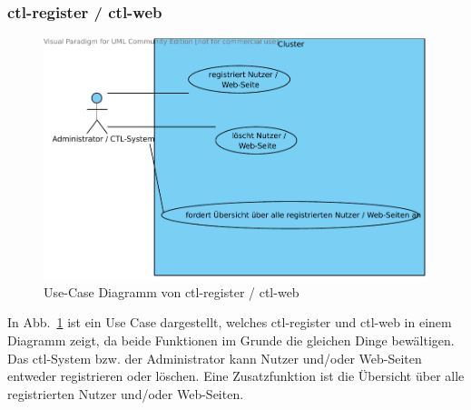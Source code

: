 \subsubsection{ctl-register / ctl-web}
\begin{figure}[H]
  \begin{center}
	\includegraphics[scale=0.6]{bilder/ctl-register_usecase.pdf}
	\caption{Use-Case Diagramm von ctl-register / ctl-web}
	\label{g_ctl-register_uc}
  \end{center}
\end{figure}
In Abb.\ \ref{g_ctl-register_uc} ist ein Use Case dargestellt, welches
ctl-register und ctl-web in einem Diagramm zeigt, da beide Funktionen im Grunde  
die gleichen Dinge bewältigen.
Das ctl-System bzw. der Administrator kann Nutzer und/oder Web-Seiten
entweder registrieren oder löschen.
Eine Zusatzfunktion ist die Übersicht über alle registrierten Nutzer
und/oder Web-Seiten.

